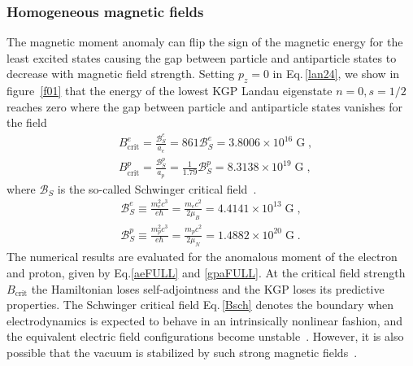 \subsubsection{Homogeneous magnetic fields} \label{sbl}
The magnetic moment anomaly can flip the sign of the magnetic energy for the least excited states causing the gap between particle and antiparticle states to decrease with magnetic field strength. Setting $p_z=0$ in Eq.\,\eqref{lan24}, we show in figure~\ref{f01} that the energy of the lowest KGP Landau eigenstate $n=0, s=1/2$ reaches zero where the gap between particle and antiparticle states vanishes for the field
\begin{subequations}
\begin{alignat}{1}\label{Bcrit}
&B_\mathrm{crit}^{e}=\frac{\mathcal{B}_{S}^{e}}{a_{e}}=861\mathcal{B}_{S}^{e} =3.8006\times10^{16}\;\mathrm{G}\;,\\
&B_\mathrm{crit}^{p}=\frac{\mathcal{B}_{S}^{p}}{a_{p}}=\frac{1}{1.79}\mathcal{B}_{S}^{p}=8.3138\times10^{19}\;\mathrm{G}\;,
\end{alignat} 
\end{subequations}
where $\mathcal{B}_{S}$ is the so-called Schwinger critical field~\cite{Schwinger:1951nm}.
\begin{subequations}
\begin{alignat}{1}\label{Bsch}
\mathcal{B}_{S}^{e}\equiv\frac{{m_{e}^2}c^3}{e\hbar}=\frac{m_{e}c^2}{2\mu_B}=4.4141\times 10^{13}\;\mathrm{G}\;,\\
\mathcal{B}_{S}^{p}\equiv\frac{{m_{p}^2}c^3}{e\hbar}=\frac{m_{p}c^2}{2\mu_N}=1.4882\times 10^{20}\;\mathrm{G}\;.
\end{alignat}
\end{subequations}
The numerical results are evaluated for the anomalous moment of the electron and proton, given by Eq.\eqref{aeFULL} and \eqref{gpaFULL}. At the critical field strength $B_\mathrm{crit}$ the Hamiltonian loses self-adjointness and the KGP loses its predictive properties. The Schwinger critical field Eq.\,\eqref{Bsch} denotes the boundary when electrodynamics is expected to behave in an intrinsically nonlinear fashion, and the equivalent electric field configurations become unstable~\cite{Labun:2008re}. However, it is also possible that the vacuum is stabilized by such strong magnetic fields~\cite{Evans:2018kor}.
 
